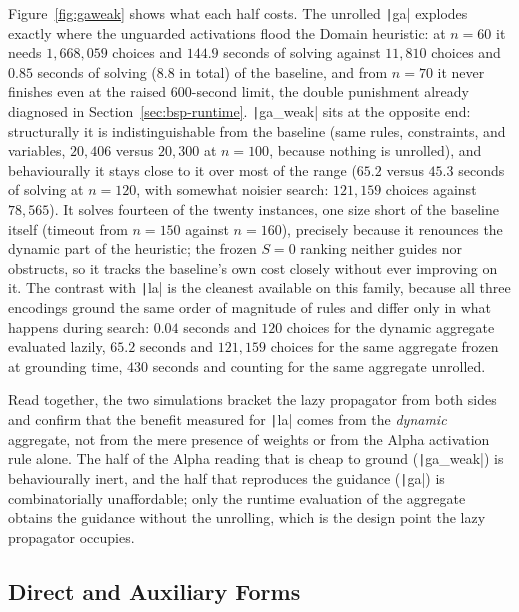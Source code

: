 Figure~\ref{fig:gaweak} shows what each half costs. The unrolled \texttt|ga| explodes exactly where the unguarded activations flood the Domain heuristic: at $n=60$ it needs $1{,}668{,}059$ choices and $144.9$ seconds of solving against $11{,}810$ choices and $0.85$ seconds of solving ($8.8$ in total) of the baseline, and from $n=70$ it never finishes even at the raised 600-second limit, the double punishment already diagnosed in Section~\ref{sec:bsp-runtime}. \texttt|ga_weak| sits at the opposite end: structurally it is indistinguishable from the baseline (same rules, constraints, and variables, $20{,}406$ versus $20{,}300$ at $n=100$, because nothing is unrolled), and behaviourally it stays close to it over most of the range ($65.2$ versus $45.3$ seconds of solving at $n=120$, with somewhat noisier search: $121{,}159$ choices against $78{,}565$). It solves fourteen of the twenty instances, one size short of the baseline itself (timeout from $n=150$ against $n=160$), precisely because it renounces the dynamic part of the heuristic; the frozen $S=0$ ranking neither guides nor obstructs, so it tracks the baseline's own cost closely without ever improving on it. The contrast with \texttt|la| is the cleanest available on this family, because all three encodings ground the same order of magnitude of rules and differ only in what happens during search: $0.04$ seconds and $120$ choices for the dynamic aggregate evaluated lazily, $65.2$ seconds and $121{,}159$ choices for the same aggregate frozen at grounding time, $430$ seconds and counting for the same aggregate unrolled.

Read together, the two simulations bracket the lazy propagator from both sides and confirm that the benefit measured for \texttt|la| comes from the \emph{dynamic} aggregate, not from the mere presence of weights or from the Alpha activation rule alone. The half of the Alpha reading that is cheap to ground (\texttt|ga_weak|) is behaviourally inert, and the half that reproduces the guidance (\texttt|ga|) is combinatorially unaffordable; only the runtime evaluation of the aggregate obtains the guidance without the unrolling, which is the design point the lazy propagator occupies.

\subsection{Direct and Auxiliary Forms}
\label{sec:aux-form}


